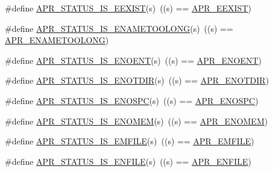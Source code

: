 \begin{DoxyCompactItemize}
\item 
\#define \mbox{\hyperlink{group___a_p_r___s_t_a_t_u_s___i_s_ga37707a0f41b084f1ce1a13575f4f21db}{A\+P\+R\+\_\+\+S\+T\+A\+T\+U\+S\+\_\+\+I\+S\+\_\+\+E\+E\+X\+I\+ST}}(s)~((s) == \mbox{\hyperlink{group___a_p_r___error_gafa7f353804388017a0ea71bc14f0dda5}{A\+P\+R\+\_\+\+E\+E\+X\+I\+ST}})
\item 
\#define \mbox{\hyperlink{group___a_p_r___s_t_a_t_u_s___i_s_gad39fb68ea626722634f81a764b3626df}{A\+P\+R\+\_\+\+S\+T\+A\+T\+U\+S\+\_\+\+I\+S\+\_\+\+E\+N\+A\+M\+E\+T\+O\+O\+L\+O\+NG}}(s)~((s) == \mbox{\hyperlink{group___a_p_r___error_ga3db63b16c2b332efe441e2661f593377}{A\+P\+R\+\_\+\+E\+N\+A\+M\+E\+T\+O\+O\+L\+O\+NG}})
\item 
\#define \mbox{\hyperlink{group___a_p_r___s_t_a_t_u_s___i_s_gad15c3b9bda78a88c02466a0d405c6047}{A\+P\+R\+\_\+\+S\+T\+A\+T\+U\+S\+\_\+\+I\+S\+\_\+\+E\+N\+O\+E\+NT}}(s)~((s) == \mbox{\hyperlink{group___a_p_r___error_gacc26a4afe01b6cc141f839be71fddf1c}{A\+P\+R\+\_\+\+E\+N\+O\+E\+NT}})
\item 
\#define \mbox{\hyperlink{group___a_p_r___s_t_a_t_u_s___i_s_gace6923483aa351b05b8f41e0bdb1df60}{A\+P\+R\+\_\+\+S\+T\+A\+T\+U\+S\+\_\+\+I\+S\+\_\+\+E\+N\+O\+T\+D\+IR}}(s)~((s) == \mbox{\hyperlink{group___a_p_r___error_gacfaa73cea75d14d49cc5c81e6c494330}{A\+P\+R\+\_\+\+E\+N\+O\+T\+D\+IR}})
\item 
\#define \mbox{\hyperlink{group___a_p_r___s_t_a_t_u_s___i_s_ga5c77e7bb1de1b6ec319f2a42eb80be1e}{A\+P\+R\+\_\+\+S\+T\+A\+T\+U\+S\+\_\+\+I\+S\+\_\+\+E\+N\+O\+S\+PC}}(s)~((s) == \mbox{\hyperlink{group___a_p_r___error_ga1dfc0bbf080f17b0b9010ef967542193}{A\+P\+R\+\_\+\+E\+N\+O\+S\+PC}})
\item 
\#define \mbox{\hyperlink{group___a_p_r___s_t_a_t_u_s___i_s_ga38ab0ab9f00c849f24aae626f5118fce}{A\+P\+R\+\_\+\+S\+T\+A\+T\+U\+S\+\_\+\+I\+S\+\_\+\+E\+N\+O\+M\+EM}}(s)~((s) == \mbox{\hyperlink{group___a_p_r___error_ga6a453e60000000609a95817efabebf4f}{A\+P\+R\+\_\+\+E\+N\+O\+M\+EM}})
\item 
\#define \mbox{\hyperlink{group___a_p_r___s_t_a_t_u_s___i_s_gae50825e6293023c570a92d185b38e393}{A\+P\+R\+\_\+\+S\+T\+A\+T\+U\+S\+\_\+\+I\+S\+\_\+\+E\+M\+F\+I\+LE}}(s)~((s) == \mbox{\hyperlink{group___a_p_r___error_gaec391eaf0bfa6aed03457ed3f796942d}{A\+P\+R\+\_\+\+E\+M\+F\+I\+LE}})
\item 
\#define \mbox{\hyperlink{group___a_p_r___s_t_a_t_u_s___i_s_ga4274ec4c91423ae54ab8a1d53991fb76}{A\+P\+R\+\_\+\+S\+T\+A\+T\+U\+S\+\_\+\+I\+S\+\_\+\+E\+N\+F\+I\+LE}}(s)~((s) == \mbox{\hyperlink{group___a_p_r___error_gaf46f59147b00c2c87d76b9eb75674456}{A\+P\+R\+\_\+\+E\+N\+F\+I\+LE}})

\end{DoxyCompactItemize}
